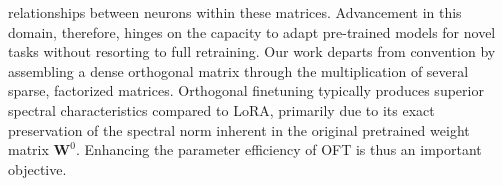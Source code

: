 relationships between neurons within these matrices. Advancement in this domain, therefore, hinges on the capacity to adapt pre-trained models for novel tasks without resorting to full retraining. Our work departs from convention by assembling a dense orthogonal matrix through the multiplication of several sparse, factorized matrices. Orthogonal finetuning typically produces superior spectral characteristics compared to LoRA, primarily due to its exact preservation of the spectral norm inherent in the original pretrained weight matrix $\bm{W}^0$. Enhancing the parameter efficiency of OFT is thus an important objective.